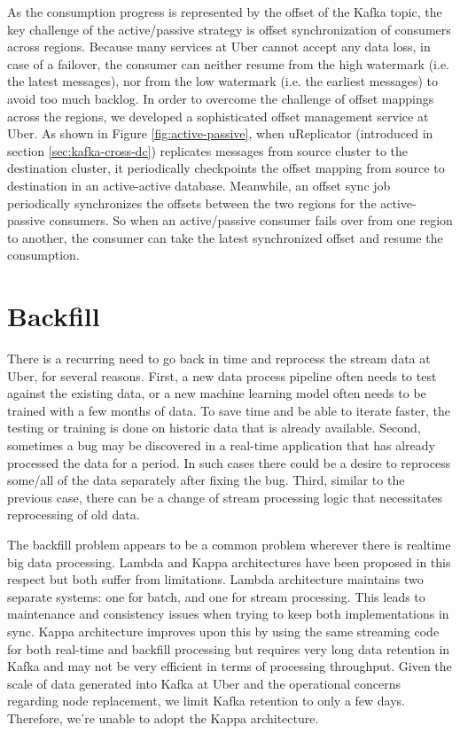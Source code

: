 \documentclass[sigconf]{acmart}
\begin{document}
As the consumption progress is represented by the offset of the Kafka topic, the key challenge of the active/passive strategy is offset synchronization of consumers across regions. Because many services at Uber cannot accept any data loss, in case of a failover, the consumer can neither resume from the high watermark (i.e. the latest messages), nor from the low watermark (i.e. the earliest messages) to avoid too much backlog. In order to overcome the challenge of offset mappings across the regions, we developed a sophisticated offset management service at Uber. As shown in Figure \ref{fig:active-passive}, when uReplicator (introduced in section \ref{sec:kafka-cross-dc}) replicates messages from source cluster to the destination cluster, it periodically checkpoints the offset mapping from source to destination in an active-active database. Meanwhile, an offset sync job periodically synchronizes the offsets between the two regions for the active-passive consumers. So when an active/passive consumer fails over from one region to another, the consumer can take the latest synchronized offset and resume the consumption.

\section{Backfill} \label{sec:backfill}

There is a recurring need to go back in time and reprocess the stream data at Uber, for several reasons. First, a new data process pipeline often needs to test against the existing data, or a new machine learning model often needs to be trained with a few months of data. To save time and be able to iterate faster, the testing or training is done on historic data that is already available. Second, sometimes a bug may be discovered in a real-time application that has already processed the data for a period. In such cases there could be a desire to reprocess some/all of the data separately after fixing the bug. Third, similar to the previous case, there can be a change of stream processing logic that necessitates reprocessing of old data.

The backfill problem appears to be a common problem wherever there is realtime big data processing. Lambda\cite{lambda} and Kappa\cite{kappa} architectures have been proposed in this respect but both suffer from limitations. Lambda architecture maintains two separate systems: one for batch, and one for stream processing. This leads to maintenance and consistency issues when trying to keep both implementations in sync. Kappa architecture improves upon this by using the same streaming code for both real-time and backfill processing but requires very long data retention in Kafka and may not be very efficient in terms of processing throughput. Given the scale of data generated into Kafka at Uber and the operational concerns regarding node replacement, we limit Kafka retention to only a few days. Therefore, we're unable to adopt the Kappa architecture.
\end{document}
